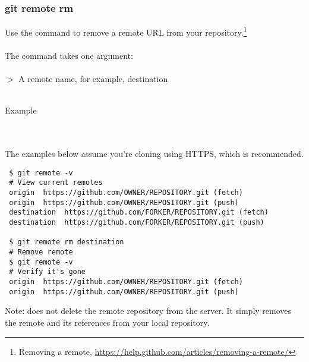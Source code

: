\subsubsection{git remote rm}
Use the  command to remove a remote URL
from your repository.\footnote{Removing a remote,
\href{https://help.github.com/articles/removing-a-remote/}{https://help.github.com/articles/removing-a-remote/}}
\\
\\
The  command takes one argument:
\\
\\
$>$ A remote name, for example, destination
\\
\\
\noindent \begin{bf}Example\end{bf}
\\
\\
The examples below assume you're cloning using HTTPS, which is recommended.

\begin{Verbatim}
 $ git remote -v
 # View current remotes
 origin  https://github.com/OWNER/REPOSITORY.git (fetch)
 origin  https://github.com/OWNER/REPOSITORY.git (push)
 destination  https://github.com/FORKER/REPOSITORY.git (fetch)
 destination  https://github.com/FORKER/REPOSITORY.git (push)

 $ git remote rm destination
 # Remove remote
 $ git remote -v
 # Verify it's gone
 origin  https://github.com/OWNER/REPOSITORY.git (fetch)
 origin  https://github.com/OWNER/REPOSITORY.git (push)
\end{Verbatim}

\noindent Note:  does not delete the remote
repository from the server.  It simply removes the remote and
its references from your local repository.
